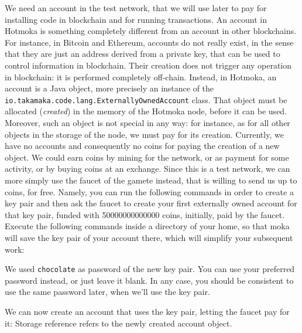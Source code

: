 We need an account in the test network, that we will use later to pay for
installing code in blockchain and for running transactions. An account in Hotmoka
is something completely different from an account in other blockchains.
For instance, in Bitcoin and Ethereum, accounts do not really exist, in the sense
that they are just an address derived from a private key, that can be used to control
information in blockchain. Their creation does not trigger any operation in blockchain:
it is performed completely off-chain. Instead, in Hotmoka, an account
is a Java object, more precisely an instance of the
\texttt{io.takamaka.code.lang.ExternallyOwnedAccount}
class. That object must be allocated (\emph{created}) in the memory of the Hotmoka node,
before it can be used. Moreover, such an object is not special in any way:
for instance, as for all other objects in the storage of the node, we must pay for its creation.
Currently, we have no accounts and consequently
no coins for paying the creation of a new object. We could
earn coins by mining for the network, or as payment for some activity,
or by buying coins at an exchange.
Since this is a test network, we can more simply use the faucet of the gamete instead,
that is willing
to send us up to \maxFaucet{} coins, for free. Namely, you can run the
following commands in order to create a key pair and then ask the faucet
to create your first externally owned account for that key pair,
funded with 50000000000000 coins, initially, paid by the faucet. Execute the following commands
inside a \texttt{\hotmokaTutorialDir{}} directory of your home, so that moka
will save the key pair of your account
there, which will simplify your subsequent work:
%
%
\begin{commentbox}
  We used \texttt{chocolate} as password of the new key pair.
  You can use your preferred password instead, or just leave it blank.
  In any case, you should be consistent to use the same password later,
  when we'll use the key pair.
\end{commentbox}
%
We can now create an account that uses the key pair, letting the faucet pay for it:
%
%
Storage reference \texttt{\accountOne} refers to the newly created account object.

